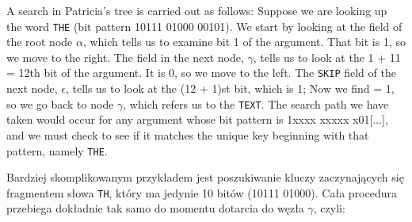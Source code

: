 	\ifsourcematerial
	\begin{displayquote}
		\color{ao(english)}
		A search in Patricia’s tree is carried out as follows: \newline
		Suppose we are looking up the word \texttt{THE} (bit pattern 10111 01000 00101). We start by looking at the field of the root node $\alpha$, which tells us to examine bit 1 of the argument. \newline
		That bit is 1, so we move to the right. The field in the next node, $\gamma$, tells us
		to look at the 1 + 11 = 12th bit of the argument. It is 0, so we move to the left. \newline
		The \texttt{SKIP} field of the next node, $\epsilon$, tells us to look at the (12 + 1)st bit, which is 1; \newline
		Now we find = 1, so we go back to node $\gamma$, which refers us to the \texttt{TEXT}. \newline
		The search path we have taken would occur for any argument whose bit pattern
		is 1xxxx xxxxx x01[...], and we must check to see if it matches the unique key
		beginning with that pattern, namely \texttt{THE}. \newline
	\end{displayquote}
	\fi
	Bardziej skomplikowanym przykładem jest poszukiwanie kluczy zaczynających się fragmentem słowa \texttt{TH}, który ma jedynie 10 bitów (10111 01000). Cała procedura przebiega dokładnie tak samo do momentu dotarcia do węzła $\gamma$, czyli:

